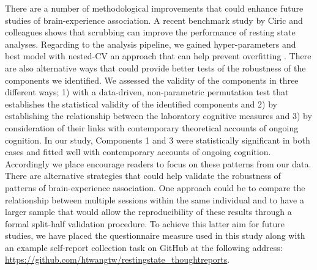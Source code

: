 There are a number of methodological improvements that could enhance future studies of brain-experience association. A recent benchmark study by Ciric and colleagues \cite{Ciric2017}%
shows that scrubbing can improve the performance of resting state analyses. Regarding to the analysis pipeline, we gained hyper-parameters and best model with nested-CV an approach that can help prevent overfitting \cite{BzdokYeo2017}.%
There are also alternative ways that could provide better tests of the robustness of the components we identified. We assessed the validity of the components in three different ways; 1) with a data-driven, non-parametric permutation test \cite{Smith2015}%
that establishes the statistical validity of the identified components and 2) by establishing the relationship between the laboratory cognitive measures and 3) by consideration of their links with contemporary theoretical accounts of ongoing cognition. In our study, Components 1 and 3 were statistically significant in both cases and fitted well with contemporary accounts of ongoing cognition. Accordingly we place encourage readers to focus on these patterns from our data. There are alternative strategies that could help validate the robustness of patterns of brain-experience association. One approach could be to compare the relationship between multiple sessions within the same individual \cite{Poldrack2015}%
and to have a larger sample that would allow the reproducibility of these results through a formal split-half validation procedure. To achieve this latter aim for future studies, we have placed the questionnaire measure used in this study along with an example self-report collection task on GitHub at the following address: \url{https://github.com/htwangtw/restingstate_thoughtreports}. 

